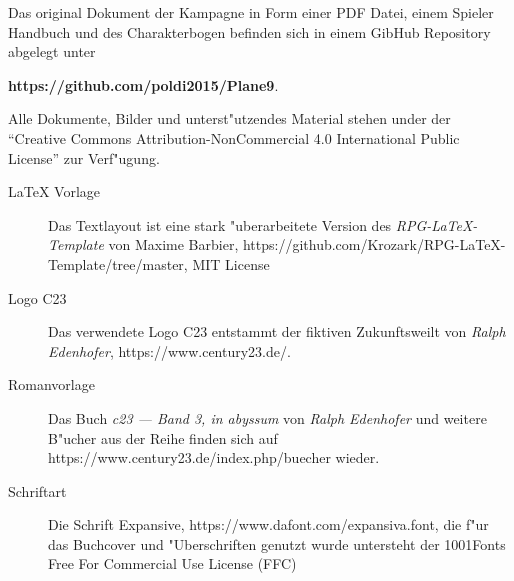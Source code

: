 \newpage
\pagestyle{empty}



Das original  Dokument der Kampagne in Form einer PDF Datei, einem Spieler Handbuch und des Charakterbogen 
befinden sich in einem GibHub Repository abgelegt unter 

\textbf{https://github.com/poldi2015/Plane9}. 

Alle Dokumente, Bilder und unterst"utzendes Material stehen under der "`Creative Commons Attribution-NonCommercial 4.0 
International Public License"' zur Verf"ugung.


\begin{description}
    \item [LaTeX Vorlage] Das Textlayout ist eine stark "uberarbeitete Version des \textit{RPG-LaTeX-Template} von 
        Maxime Barbier, https://github.com/Krozark/RPG-LaTeX-Template/tree/master, MIT License
    \item [Logo C23] Das verwendete Logo C23 entstammt der fiktiven Zukunftsweilt von \emph{Ralph  Edenhofer}, 
        \newline{}https://www.century23.de/.
    \item [Romanvorlage] Das Buch \emph{c23 --- Band 3, in abyssum} von \emph{Ralph  Edenhofer} und weitere B"ucher aus der Reihe finden 
        sich auf https://www.century23.de/index.php/buecher wieder.
    \item [Schriftart] Die Schrift Expansive, https://www.dafont.com/expansiva.font, die f"ur das Buchcover und 
        "Uberschriften genutzt wurde untersteht der 1001Fonts Free For Commercial Use License (FFC)    
\end{description}